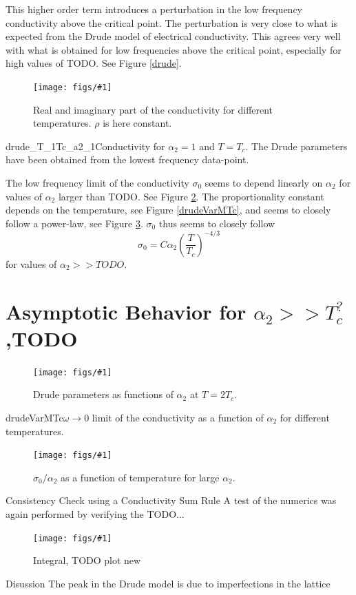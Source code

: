 \documentclass[12pt]{report}
\newcommand{\fig}[3]{
\begin{figure}
\centering
\texttt{[image: figs/\#1]}
\caption{#2}
\end{figure}
}
\begin{document}
This higher order term introduces a perturbation in the low frequency conductivity above the critical point. The perturbation is very close to what is expected from the Drude model of electrical conductivity. 
This agrees very well with what is obtained for low frequencies above the critical point, especially for high values of TODO. See Figure \ref{drude}.

\fig{cond_Ts_a2_0.1_v2.pdf}{Real and imaginary part of the conductivity for different temperatures. $\rho$ is here constant.\label{f:cond}}


\fig{drude_T_1Tc_a2_1}{Conductivity for $\alpha_2=1$ and $T=T_c$. The Drude parameters have been obtained from the lowest frequency data-point. \label{drude}}

The low frequency limit of the conductivity $\sigma_0$ seems to depend linearly on $\alpha_2$ for values of $\alpha_2$ larger than TODO. See Figure \ref{drudeVar2Tc}. The proportionality constant depends on the temperature, see Figure \ref{drudeVarMTc}, and seems to closely follow a power-law, see Figure \ref{drudeTdep_1e4}. $\sigma_0$ thus seems to closely follow
\begin{equation}
 \sigma_0=C\alpha_2\left(\frac{T}{T_c}\right)^{-4/3}
\end{equation}
for values of $\alpha_2>>TODO$.


\section{Asymptotic Behavior for $\alpha_2>>T_c^?$,TODO}
\fig{drudeVar2Tc}{Drude parameters as functions of $\alpha_2$ at $T=2T_c$.\label{drudeVar2Tc}}

\fig{drudeVarMTc}{$\omega\rightarrow0$ limit of the conductivity as a function of $\alpha_2$ for different temperatures.\label{drudeVarMTc}}

\fig{drudeTdep_1e4}{$\sigma_0/\alpha_2$ as a function of temperature for large $\alpha_2$.\label{drudeTdep_1e4}}
\section{Consistency Check using a Conductivity Sum Rule}
A test of the numerics was again performed by verifying the TODO...
\fig{sum_rule_a20}{Integral, TODO plot new}

\section{Disussion}
The peak in the Drude model is due to imperfections in the lattice
\end{document}
